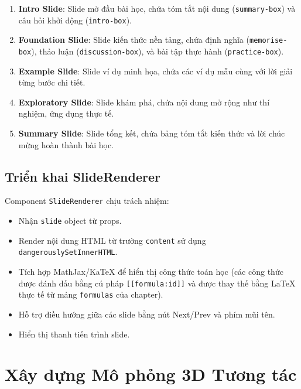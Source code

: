 \begin{enumerate}
    \item \textbf{Intro Slide}: Slide mở đầu bài học, chứa tóm tắt nội dung (\texttt{summary-box}) và câu hỏi khởi động (\texttt{intro-box}).
    
    \item \textbf{Foundation Slide}: Slide kiến thức nền tảng, chứa định nghĩa (\texttt{memorise-box}), thảo luận (\texttt{discussion-box}), và bài tập thực hành (\texttt{practice-box}).
    
    \item \textbf{Example Slide}: Slide ví dụ minh họa, chứa các ví dụ mẫu cùng với lời giải từng bước chi tiết.
    
    \item \textbf{Exploratory Slide}: Slide khám phá, chứa nội dung mở rộng như thí nghiệm, ứng dụng thực tế.
    
    \item \textbf{Summary Slide}: Slide tổng kết, chứa bảng tóm tắt kiến thức và lời chúc mừng hoàn thành bài học.
\end{enumerate}

\subsection{Triển khai SlideRenderer}

Component \texttt{SlideRenderer} chịu trách nhiệm:

\begin{itemize}
    \item Nhận \texttt{slide} object từ props.
    \item Render nội dung HTML từ trường \texttt{content} sử dụng \texttt{dangerouslySetInnerHTML}.
    \item Tích hợp MathJax/KaTeX để hiển thị công thức toán học (các công thức được đánh dấu bằng cú pháp \texttt{[[formula:id]]} và được thay thế bằng LaTeX thực tế từ mảng \texttt{formulas} của chapter).
    \item Hỗ trợ điều hướng giữa các slide bằng nút Next/Prev và phím mũi tên.
    \item Hiển thị thanh tiến trình slide.
\end{itemize}

\section{Xây dựng Mô phỏng 3D Tương tác}

